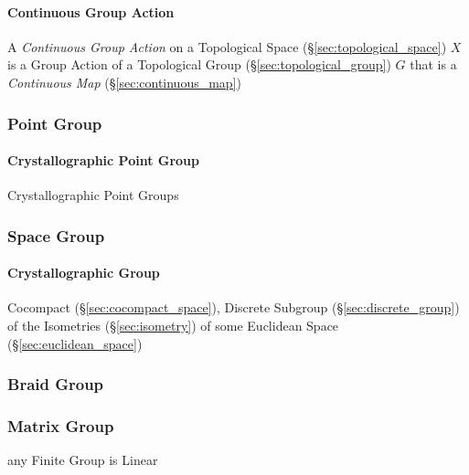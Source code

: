 \paragraph{Continuous Group Action}\label{sec:continuous_group_action}

A \emph{Continuous Group Action} on a Topological Space
(\S\ref{sec:topological_space}) $X$ is a Group Action of a Topological Group
(\S\ref{sec:topological_group}) $G$ that is a \emph{Continuous Map}
(\S\ref{sec:continuous_map})



\subsubsection{Point Group}\label{sec:point_group}

\paragraph{Crystallographic Point Group}\label{sec:crystallographic_point_group}
\hfill

Crystallographic Point Groups



\subsubsection{Space Group}\label{sec:space_group}

\paragraph{Crystallographic Group}\label{sec:crystallographic_group}\hfill

Cocompact (\S\ref{sec:cocompact_space}), Discrete Subgroup
(\S\ref{sec:discrete_group}) of the Isometries (\S\ref{sec:isometry}) of some
Euclidean Space (\S\ref{sec:euclidean_space})



\subsubsection{Braid Group}\label{sec:braid_group}

\subsubsection{Matrix Group}\label{sec:matrix_group}

any Finite Group is Linear



